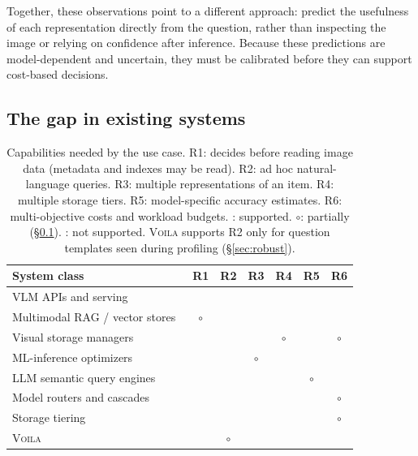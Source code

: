 \documentclass[10pt,conference]{IEEEtran}
\newcommand{\system}{\textsc{Voila}\xspace}
\newcommand{\yes}{\ding{51}}
\newcommand{\no}{\ding{55}}
\newcommand{\half}{$\circ$}
\newcommand{\tableformat}{\footnotesize\setlength{\tabcolsep}{3pt}\renewcommand{\arraystretch}{0.95}}
\begin{document}
Together, these observations point to a different approach: predict the usefulness of each representation directly from the question, rather than inspecting the image or relying on confidence after inference. Because these predictions are model-dependent and uncertain, they must be calibrated before they can support cost-based decisions.



\subsection{The gap in existing systems}
\label{sec:gap}

\begin{table}[htbp]
\centering
\tableformat
\caption{Capabilities needed by the use case. R1: decides before reading
image data (metadata and indexes may be read). R2: ad hoc natural-language queries. R3: multiple representations of an
item. R4: multiple storage tiers. R5: model-specific accuracy estimates. R6:
multi-objective costs and workload budgets. \yes: supported. \half: partially
(\S\ref{sec:gap}). \no: not supported. \system supports R2 only for question
templates seen during profiling (\S\ref{sec:robust}).}
\label{tab:gap}
\begin{tabular}{lcccccc}
\toprule
System class & R1 & R2 & R3 & R4 & R5 & R6 \\
\midrule
VLM APIs and serving~\cite{kwon2023vllm} & \no & \yes & \no & \no & \no & \no \\
Multimodal RAG / vector stores~\cite{lewis2020rag,chen2022murag} & \half & \yes & \no & \no & \no & \no \\
Visual storage managers~\cite{xu2019vstore,haynes2021vss,daum2021tasm} & \yes & \no & \yes & \half & \no & \half \\
ML-inference optimizers~\cite{kang2017noscope,kang2020blazeit,lu2018probabilistic,kang2022tasti,kang2020smol} & \no & \no & \half & \no & \yes & \yes \\
LLM semantic query engines~\cite{patel2024lotus,liu2025palimpzest,jo2024thalamusdb,urban2024caesura} & \no & \yes & \no & \no & \half & \yes \\
Model routers and cascades~\cite{chen2023frugalgpt,chen2020frugalml,wang2024routellm} & \no & \yes & \no & \no & \yes & \half \\
Storage tiering~\cite{aws_s3_intelligent_tiering} & \yes & \no & \no & \yes & \no & \half \\
\midrule
\system & \yes & \half & \yes & \yes & \yes & \yes \\
\bottomrule
\end{tabular}
\end{table}
\end{document}
